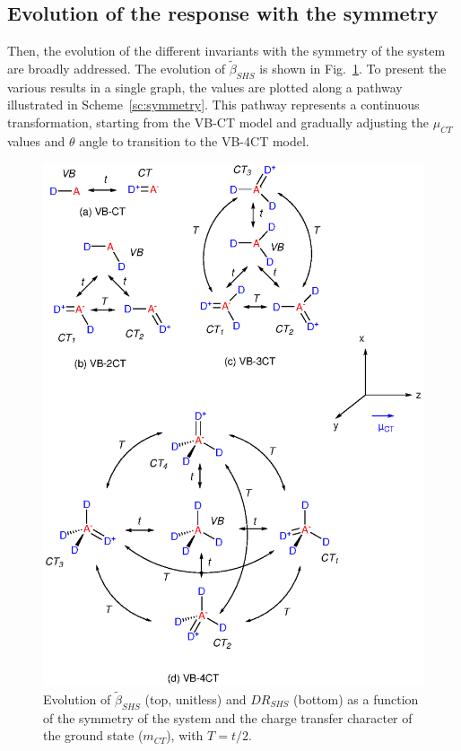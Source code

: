 \documentclass[journal=jpcafh]{achemso}
\begin{document}
\clearpage

\subsection{Evolution of the response with the symmetry}

Then, the evolution of the different invariants with the symmetry of the system are broadly addressed.
The evolution of $\tilde\beta_{SHS}$ is shown in Fig.~\ref{fig:beta}. To present the various results in a single graph, the values are plotted along a pathway illustrated in Scheme~\ref{sc:symmetry}. This pathway represents a continuous transformation, starting from the VB-CT model and gradually adjusting the $\mu_{CT}$ values and $\theta$ angle to transition to the VB-4CT model.

\begin{figure}[!h]
	\includegraphics[width=.8\linewidth]{Figure2}
	\caption{Evolution of $\tilde \beta_{SHS}$ (top, unitless) and $DR_{SHS}$ (bottom) as a function of the symmetry of the system and the charge transfer character of the ground state ($m_{CT}$), with $T=t/2$.}
	\label{fig:beta}
\end{figure}
\end{document}
